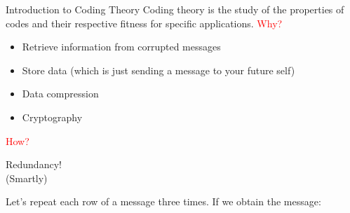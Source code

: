 \begin{frame}{Introduction to Coding Theory}
    Coding theory is the study of the properties of codes and their respective fitness for specific applications.
    \textcolor{red}{Why?}
    \begin{itemize}
        \item Retrieve information from corrupted messages
        \item Store data (which is just sending a message to your future self)
        \item Data compression
        \item Cryptography
    \end{itemize}
\end{frame}
\begin{frame}

    \vspace{-2cm} %
    \hspace{2.3cm}\textcolor{red}{How?}
    \begin{center}
        \alert<1>{\Huge Redundancy!} \\ \pause
        \alert<3>{\huge (Smartly)}
    \end{center}
    \pause
    Let's repeat each row of a message three times. If we obtain the message:
    
    \pause
    
    
\end{frame}
